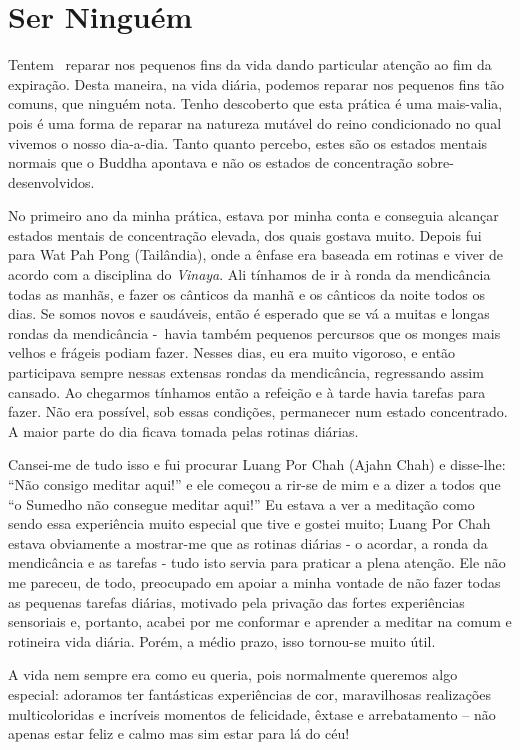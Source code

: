 \chapter{Ser Ninguém}

Tentem ~reparar nos pequenos fins da vida dando particular atenção ao
fim da expiração. Desta maneira, na vida diária, podemos reparar nos
pequenos fins tão comuns, que ninguém nota. Tenho descoberto que esta
prática é uma mais-valia, pois é uma forma de reparar na natureza
mutável do reino condicionado no qual vivemos o nosso dia-a-dia. Tanto
quanto percebo, estes são os estados mentais normais que o Buddha
apontava e não os estados de concentração sobre-desenvolvidos.

No primeiro ano da minha prática, estava por minha conta e conseguia
alcançar estados mentais de concentração elevada, dos quais gostava
muito. Depois fui para Wat Pah Pong (Tailândia), onde a ênfase era
baseada em rotinas e viver de acordo com a disciplina do \emph{Vinaya}.
Ali tínhamos de ir à ronda da mendicância todas as manhãs, e fazer os
cânticos da manhã e os cânticos da noite todos os dias. Se somos novos e
saudáveis, então é esperado que se vá a muitas e longas rondas da
mendicância -~havia também pequenos percursos que os monges mais velhos
e frágeis podiam fazer. Nesses dias, eu era muito vigoroso, e então
participava sempre nessas extensas rondas da mendicância, regressando
assim cansado. Ao chegarmos tínhamos então a refeição e à tarde havia
tarefas para fazer. Não era possível, sob essas condições, permanecer
num estado concentrado. A maior parte do dia ficava tomada pelas rotinas
diárias.

Cansei-me de tudo isso e fui procurar Luang Por Chah (Ajahn Chah) e
disse-lhe: ``Não consigo meditar aqui!'' e ele começou a rir-se de mim e
a dizer a todos que ``o Sumedho não consegue meditar aqui!'' Eu estava a
ver a meditação como sendo essa experiência muito especial que tive e
gostei muito; Luang Por Chah estava obviamente a mostrar-me que as
rotinas diárias - o acordar, a ronda da mendicância e as tarefas - tudo
isto servia para praticar a plena atenção. Ele não me pareceu, de todo,
preocupado em apoiar a minha vontade de não fazer todas as pequenas
tarefas diárias, motivado pela privação das fortes experiências
sensoriais e, portanto, acabei por me conformar e aprender a meditar na
comum e rotineira vida diária. Porém, a médio prazo, isso tornou-se
muito útil.

A vida nem sempre era como eu queria, pois normalmente queremos algo
especial: adoramos ter fantásticas experiências de cor, maravilhosas
realizações multicoloridas e incríveis momentos de felicidade, êxtase e
arrebatamento -- não apenas estar feliz e calmo mas sim estar para lá do
céu!

